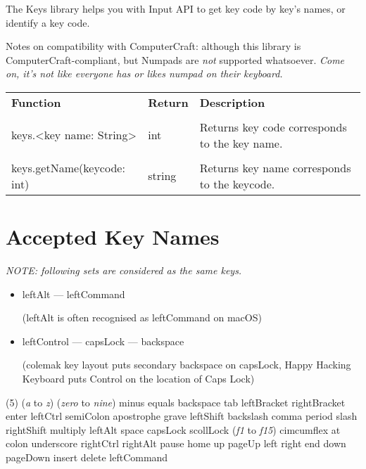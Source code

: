 The Keys library helps you with Input API to get key code by key's names, or identify a key code.

Notes on compatibility with ComputerCraft: although this library is ComputerCraft-compliant, but Numpads are \emph{not} supported whatsoever. \textit{Come on, it's not like everyone has or likes numpad on their keyboard.}

\begin{tabularx}{\textwidth}{l l X}
	\textbf{\large Function} & \textbf{\large Return} & \textbf{\large Description}
	\\ \\
	\endhead
	keys.<key name: String> & int & Returns key code corresponds to the key name.
	\\ \\
	keys.getName(keycode: int) & string & Returns key name corresponds to the keycode.
\end{tabularx}

\section{Accepted Key Names}

\emph{NOTE: following sets are considered as the same keys.}

\begin{itemize}
\item leftAlt --- leftCommand

(leftAlt is often recognised as leftCommand on macOS)

\item leftControl --- capsLock --- backspace

(colemak key layout puts secondary backspace on capsLock, Happy Hacking Keyboard puts Control on the location of Caps Lock)
\end{itemize}

\begin{tasks}[counter-format=\-](5)
	\task (\emph{a} to \emph{z})
	\task (\emph{zero} to \emph{nine})
	\task minus
	\task equals
	\task backspace
	\task tab
	\task leftBracket
	\task rightBracket
	\task enter
	\task leftCtrl
	\task semiColon
	\task apostrophe
	\task grave
	\task leftShift
	\task backslash
	\task comma
	\task period
	\task slash
	\task rightShift
	\task multiply
	\task leftAlt
	\task space
	\task capsLock
	\task scollLock
	\task (\emph{f1} to \emph{f15})
	\task cimcumflex
	\task at
	\task colon
	\task underscore
	\task rightCtrl
	\task rightAlt
	\task pause
	\task home
	\task up
	\task pageUp
	\task left
	\task right
	\task end
	\task down
	\task pageDown
	\task insert
	\task delete
	\task leftCommand
\end{tasks}